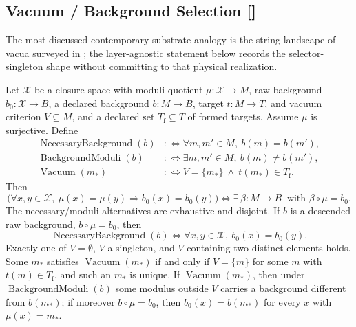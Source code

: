 \subsection{Vacuum / Background Selection [\texorpdfstring{}{F50}]}\label{sec:self-reference-limits:vacuum}

The most discussed contemporary substrate analogy is the string
landscape of vacua surveyed in \citet{Susskind2003Landscape};
the layer-agnostic statement below records the selector-singleton
shape without committing to that physical realization.

\begin{theorem}\label{thm:F50}
Let \(\mathcal X\) be a closure space with moduli quotient
\(\mu:\mathcal X\to M\), raw background \(b_0:\mathcal X\to B\),
a declared background \(b:M\to B\), target \(t:M\to T\), and vacuum
criterion \(V\subseteq M\), and a declared set \(T_{\mathrm{f}}\subseteq T\)
of formed targets. Assume \(\mu\) is surjective. Define
\begin{align*}
  \operatorname{NecessaryBackground}(b)
  &:\Longleftrightarrow \forall m,m'\in M,\ b(m)=b(m'),\\
  \operatorname{BackgroundModuli}(b)
  &:\Longleftrightarrow \exists m,m'\in M,\ b(m)\ne b(m'),\\
  \operatorname{Vacuum}(m_\ast)
  &:\Longleftrightarrow V=\{m_\ast\}\ \wedge\ t(m_\ast)\in T_{\mathrm{f}}.
\end{align*}
Then
\[
  \bigl(\forall x,y\in\mathcal X,\ \mu(x)=\mu(y)\Rightarrow b_0(x)=b_0(y)\bigr)
  \iff
  \exists\,\beta:M\to B\ \text{ with } \beta\circ\mu=b_0.
\]
The necessary/moduli alternatives are exhaustive and disjoint. If \(b\) is
a descended raw background, \(b\circ\mu=b_0\), then
\[
  \operatorname{NecessaryBackground}(b)
  \iff \forall x,y\in\mathcal X,\ b_0(x)=b_0(y).
\]
Exactly one of \(V=\emptyset\), \(V\) a singleton, and \(V\) containing two
distinct elements holds. Some \(m_\ast\) satisfies
\(\operatorname{Vacuum}(m_\ast)\) if and only if \(V=\{m\}\) for some \(m\)
with \(t(m)\in T_{\mathrm{f}}\), and such an \(m_\ast\) is unique. If
\(\operatorname{Vacuum}(m_\ast)\), then under \(\operatorname{BackgroundModuli}(b)\) some modulus outside \(V\) carries a background different from \(b(m_\ast)\); if moreover \(b\circ\mu=b_0\), then \(b_0(x)=b(m_\ast)\) for
every \(x\) with \(\mu(x)=m_\ast\).
\end{theorem}
